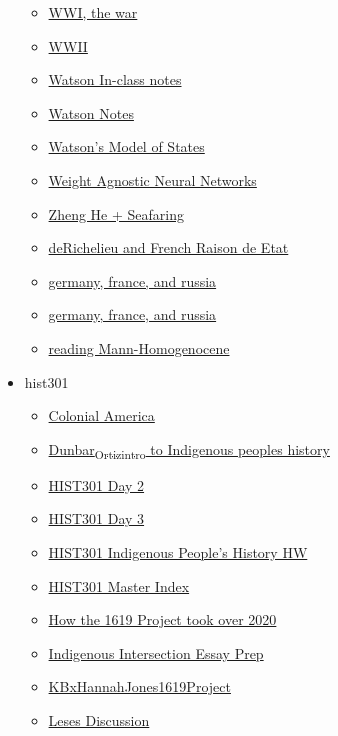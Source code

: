 \documentclass[11pt]{article}
\begin{document}
\begin{itemize}
\begin{itemize}
\item \href{hist201/KBhHIST201WWIActualWar.org}{WWI, the war}
\item \href{hist201/KBhHIST201WWII.org}{WWII}
\item \href{hist201/KBWatsonInClassNotes.org}{Watson In-class notes}
\item \href{hist201/KB20200825121700.org}{Watson Notes}
\item \href{hist201/KBhHIST201Watson.org}{Watson's Model of States}
\item \href{hist201/KBWeightAgnosticNN.org}{Weight Agnostic Neural Networks}
\item \href{hist201/KBhHIST201ZhengHeSeafaring.org}{Zheng He + Seafaring}
\item \href{hist201/KBhHIST201FrenchRichelieuAndRaisonDeEtat.org}{deRichelieu and French Raison de Etat}
\item \href{hist201/KBe21hist201retWWICausesPowerStruggle.org}{germany, france, and russia}
\item \href{hist201/KBe21hist201floWWICauses.org}{germany, france, and russia}
\item \href{hist201/KB20200826092400.org}{reading Mann-Homogenocene}
\end{itemize}
\item hist301
\begin{itemize}
\item \href{hist301/KBhHIST301ColonialAmerica.org}{Colonial America}
\item \href{hist301/KBxIndigenousPeoplesHistoftheUS.org}{Dunbar\textsubscript{Ortiz}\textsubscript{intro} to Indigenous peoples history}
\item \href{hist301/KBdHIST301Day2.org}{HIST301 Day 2}
\item \href{hist301/KBdHIST301Day3.org}{HIST301 Day 3}
\item \href{hist301/KBdHIST301HWIndigenousPeoplesHistory.org}{HIST301 Indigenous People's History HW}
\item \href{hist301/KBHIST301MasterIndex.org}{HIST301 Master Index}
\item \href{hist301/KBx1619ProjectTookOver2020.org}{How the 1619 Project took over 2020}
\item \href{hist301/KBhIntersectionsEssayPrep.org}{Indigenous Intersection Essay Prep}
\item \href{hist301/KBxHannahJones1619Project.org}{KBxHannahJones1619Project}
\item \href{hist301/KBhHIST301Lenses.org}{Leses Discussion}

\end{itemize}
\end{itemize}
\end{document}
